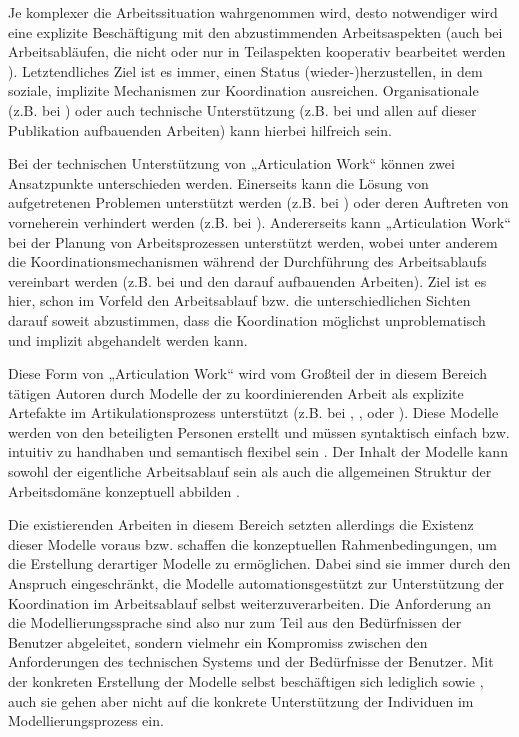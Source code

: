 Je komplexer die Arbeitssituation wahrgenommen wird, desto notwendiger wird eine explizite Beschäftigung mit den abzustimmenden Arbeitsaspekten (auch bei Arbeitsabläufen, die nicht oder nur in Teilaspekten kooperativ bearbeitet werden \citep{Fjuk97}). Letztendliches Ziel ist es immer, einen Status (wieder-)herzustellen, in dem soziale, implizite Mechanismen zur Koordination ausreichen. Organisationale (z.B. bei \citep{Grinter96}) oder auch technische Unterstützung (z.B. bei \citep{Schmidt00} und allen auf dieser Publikation aufbauenden Arbeiten) kann hierbei hilfreich sein.

Bei der technischen Unterstützung von „Articulation Work“ können zwei Ansatzpunkte unterschieden werden. Einerseits kann die Lösung von aufgetretenen Problemen unterstützt werden (z.B. bei \citep{Grinter96}) oder deren Auftreten von vorneherein verhindert werden (z.B. bei \citep{Raposo04}). Andererseits kann „Articulation Work“ bei der Planung von Arbeitsprozessen unterstützt werden, wobei unter anderem die Koordinationsmechanismen während der Durchführung des Arbeitsablaufs vereinbart werden (z.B. bei \citet{Sarini02a} und den darauf aufbauenden Arbeiten). Ziel ist es hier, schon im Vorfeld den Arbeitsablauf bzw. die unterschiedlichen Sichten darauf soweit abzustimmen, dass die Koordination möglichst unproblematisch und implizit abgehandelt werden kann.

Diese Form von „Articulation Work“ wird vom Großteil der in diesem Bereich tätigen Autoren durch Modelle der zu koordinierenden Arbeit als explizite Artefakte im Artikulationsprozess unterstützt (z.B. bei \citep{Divitini00}, \citep{Sarini02}, \citep{Raposo04} oder \citep{Jorgensen04}). Diese Modelle werden von den beteiligten Personen erstellt und müssen syntaktisch einfach bzw. intuitiv zu handhaben und semantisch flexibel sein \citep{Herrmann02} \citep{Jorgensen04}. Der Inhalt der Modelle kann sowohl der eigentliche Arbeitsablauf sein \citep{Divitini00} als auch die allgemeinen Struktur der Arbeitsdomäne konzeptuell abbilden \citep{Sarini02}. 

Die \wichtig existierenden Arbeiten in diesem Bereich setzten allerdings die Existenz dieser Modelle voraus bzw. schaffen die konzeptuellen Rahmenbedingungen, um die Erstellung derartiger Modelle zu ermöglichen. Dabei sind sie immer durch den Anspruch eingeschränkt, die Modelle automationsgestützt zur Unterstützung der Koordination im Arbeitsablauf selbst weiterzuverarbeiten. Die Anforderung an die Modellierungssprache sind also nur zum Teil aus den Bedürfnissen der Benutzer abgeleitet, sondern vielmehr ein Kompromiss zwischen den Anforderungen des technischen Systems und der Bedürfnisse der Benutzer. Mit der konkreten Erstellung der Modelle selbst beschäftigen sich lediglich \citet{Herrmann02} sowie \citet{Jorgensen04}, auch sie gehen aber nicht auf die konkrete Unterstützung der Individuen im Modellierungsprozess ein.

